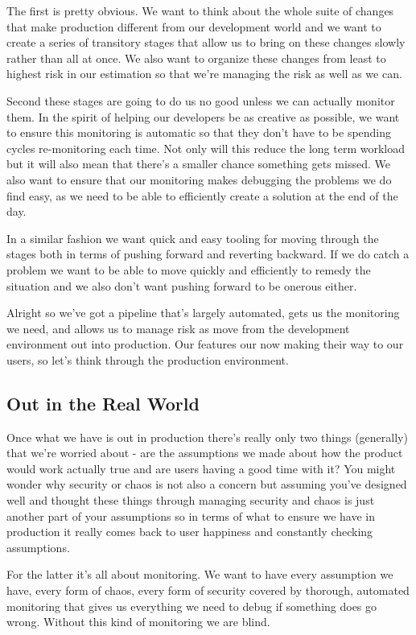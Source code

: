 \documentclass[10pt,a5paper]{book}
\begin{document}
The first is pretty obvious. We want to think about the whole suite of changes that make production different from our development world and we want to create a series of transitory stages that allow us to bring on these changes slowly rather than all at once. We also want to organize these changes from least to highest risk in our estimation so that we're managing the risk as well as we can. 

Second these stages are going to do us no good unless we can actually monitor them. In the spirit of helping our developers be as creative as possible, we want to ensure this monitoring is automatic so that they don't have to be spending cycles re-monitoring each time. Not only will this reduce the long term workload but it will also mean that there's a smaller chance something gets missed. We also want to ensure that our monitoring makes debugging the problems we do find easy, as we need to be able to efficiently create a solution at the end of the day.

In a similar fashion we want quick and easy tooling for moving through the stages both in terms of pushing forward and reverting backward. If we do catch a problem we want to be able to move quickly and efficiently to remedy the situation and we also don't want pushing forward to be onerous either. 

Alright so we've got a pipeline that's largely automated, gets us the monitoring we need, and allows us to manage risk as move from the development environment out into production. Our features our now making their way to our users, so let's think through the production environment. 

\subsection{Out in the Real World}
Once what we have is out in production there's really only two things (generally) that we're worried about - are the assumptions we made about how the product would work actually true and are users having a good time with it? You might wonder why security or chaos is not also a concern but assuming you've designed well and thought these things through managing security and chaos is just another part of your assumptions so in terms of what to ensure we have in production it really comes back to user happiness and constantly checking assumptions. 

For the latter it's all about monitoring. We want to have every assumption we have, every form of chaos, every form of security covered by thorough, automated monitoring that gives us everything we need to debug if something does go wrong. Without this kind of monitoring we are blind. 
\end{document}
